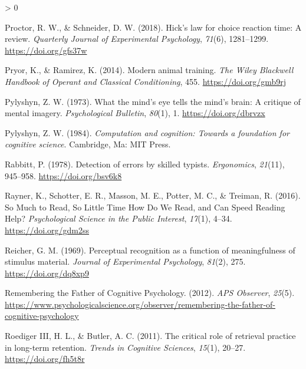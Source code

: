 \documentclass[
  oneside,
  12pt]{crumpbook}
\newlength{\cslhangindent}
\newenvironment{CSLReferences}[2] %
 {%
  \setlength{\parindent}{0pt}
  \ifodd #1 \everypar{\setlength{\hangindent}{\cslhangindent}}\ignorespaces\fi
  \ifnum #2 > 0
  \setlength{\parskip}{#2\baselineskip}
  \fi
 }%
 {}
\begin{document}
\begin{CSLReferences}{1}{0}
\leavevmode\hypertarget{ref-proctorHickLawChoice2018}{}%
Proctor, R. W., \& Schneider, D. W. (2018). Hick's law for choice reaction time: {A} review. \emph{Quarterly Journal of Experimental Psychology}, \emph{71}(6), 1281--1299. \url{https://doi.org/gfs37w}

\leavevmode\hypertarget{ref-pryorModernAnimalTraining2014}{}%
Pryor, K., \& Ramirez, K. (2014). Modern animal training. \emph{The Wiley Blackwell Handbook of Operant and Classical Conditioning}, 455. \url{https://doi.org/gmb9rj}

\leavevmode\hypertarget{ref-pylyshynWhatMindEye1973}{}%
Pylyshyn, Z. W. (1973). What the mind's eye tells the mind's brain: {A} critique of mental imagery. \emph{Psychological Bulletin}, \emph{80}(1), 1. \url{https://doi.org/dbrvzx}

\leavevmode\hypertarget{ref-pylyshynComputationCognitionFoundation1984}{}%
Pylyshyn, Z. W. (1984). \emph{Computation and cognition: {Towards} a foundation for cognitive science}. {Cambridge, Ma: MIT Press}.

\leavevmode\hypertarget{ref-rabbittDetectionErrorsSkilled1978}{}%
Rabbitt, P. (1978). Detection of errors by skilled typists. \emph{Ergonomics}, \emph{21}(11), 945--958. \url{https://doi.org/bsv6k8}

\leavevmode\hypertarget{ref-raynerMuchReadLittle2016}{}%
Rayner, K., Schotter, E. R., Masson, M. E., Potter, M. C., \& Treiman, R. (2016). So {Much} to {Read}, {So Little Time How Do We Read}, and {Can Speed Reading Help}? \emph{Psychological Science in the Public Interest}, \emph{17}(1), 4--34. \url{https://doi.org/gdm2ss}

\leavevmode\hypertarget{ref-reicherPerceptualRecognitionFunction1969}{}%
Reicher, G. M. (1969). Perceptual recognition as a function of meaningfulness of stimulus material. \emph{Journal of Experimental Psychology}, \emph{81}(2), 275. \url{https://doi.org/dq8xp9}

\leavevmode\hypertarget{ref-RememberingFatherCognitive2012}{}%
Remembering the {Father} of {Cognitive Psychology}. (2012). \emph{APS Observer}, \emph{25}(5). \url{https://www.psychologicalscience.org/observer/remembering-the-father-of-cognitive-psychology}

\leavevmode\hypertarget{ref-roedigeriiiCriticalRoleRetrieval2011}{}%
Roediger III, H. L., \& Butler, A. C. (2011). The critical role of retrieval practice in long-term retention. \emph{Trends in Cognitive Sciences}, \emph{15}(1), 20--27. \url{https://doi.org/fh5t8r}


\end{CSLReferences}
\end{document}
